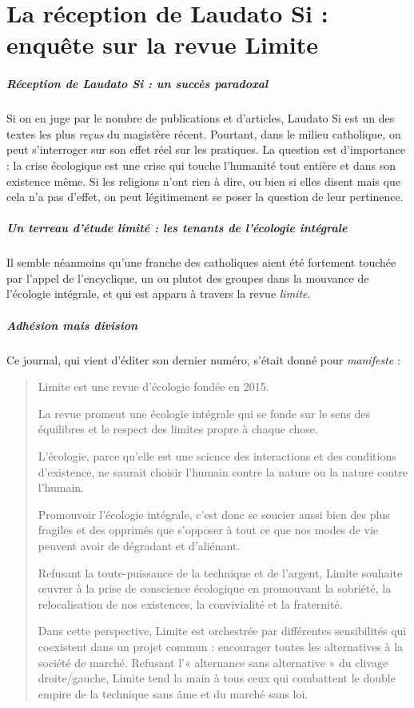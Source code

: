 \chapter{La réception de Laudato Si : enquête sur la revue Limite}


\paragraph{Réception de Laudato Si : un succès paradoxal} Si on en juge par le nombre de publications et d'articles, Laudato Si est un des textes les plus \textit{reçus} du magistère récent. Pourtant, dans le milieu catholique, on peut s'interroger sur son effet réel sur les pratiques.
La question est d'importance : la crise écologique est une crise qui touche l'humanité tout entière et dans son existence même. Si les religions n'ont rien à dire, ou bien si elles disent mais que cela n'a pas d'effet, on peut légitimement se poser la question de leur pertinence.

\paragraph{Un terreau d'étude limité : les tenants de l'écologie intégrale} Il semble néanmoins qu'une franche des catholiques aient été fortement touchée par l'appel de l'encyclique, un ou plutot des groupes dans la mouvance de l'écologie intégrale, et qui est apparu à travers la revue \textit{limite}.

\paragraph{Adhésion mais division} Ce journal, qui vient d'éditer son dernier numéro, s'était donné pour \textit{manifeste} : 
\begin{quote}
    Limite est une revue d’écologie fondée en 2015.

La revue promeut une écologie intégrale qui se fonde sur le sens des équilibres et le respect des limites propre à chaque chose.

L’écologie, parce qu’elle est une science des interactions et des conditions d’existence, ne saurait choisir l’humain contre la nature ou la nature contre l’humain.

Promouvoir l’écologie intégrale, c’est donc se soucier aussi bien des plus fragiles et des opprimés que s’opposer à tout ce que nos modes de vie peuvent avoir de dégradant et d’aliénant.

Refusant la toute-puissance de la technique et de l’argent, Limite souhaite œuvrer à la prise de conscience écologique en promouvant la sobriété, la relocalisation de nos existences, la convivialité et la fraternité.

Dans cette perspective, Limite est orchestrée par différentes sensibilités qui coexistent dans un projet commun : encourager toutes les alternatives à la société de marché. Refusant l’« alternance sans alternative » du clivage droite/gauche, Limite tend la main à tous ceux qui combattent le double empire de la technique sans âme et du marché sans loi.
\end{quote}

